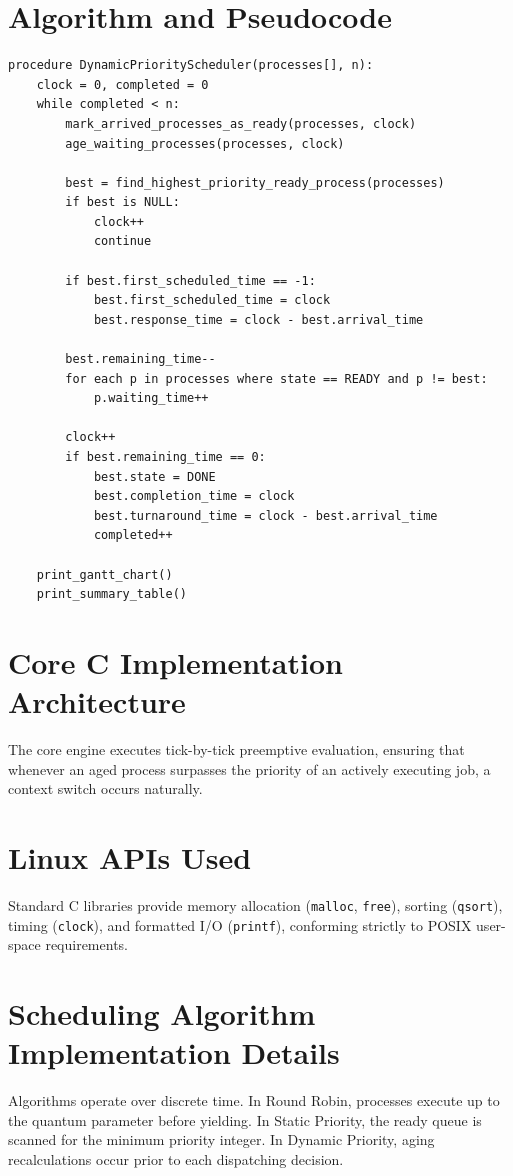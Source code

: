 \documentclass[12pt,a4paper]{report}
\begin{document}
\section{Algorithm and Pseudocode}
\begin{lstlisting}[caption={Dynamic Priority Scheduling Pseudocode}]
procedure DynamicPriorityScheduler(processes[], n):
    clock = 0, completed = 0
    while completed < n:
        mark_arrived_processes_as_ready(processes, clock)
        age_waiting_processes(processes, clock)
        
        best = find_highest_priority_ready_process(processes)
        if best is NULL:
            clock++
            continue
            
        if best.first_scheduled_time == -1:
            best.first_scheduled_time = clock
            best.response_time = clock - best.arrival_time
            
        best.remaining_time--
        for each p in processes where state == READY and p != best:
            p.waiting_time++
            
        clock++
        if best.remaining_time == 0:
            best.state = DONE
            best.completion_time = clock
            best.turnaround_time = clock - best.arrival_time
            completed++
            
    print_gantt_chart()
    print_summary_table()
\end{lstlisting}

\section{Core C Implementation Architecture}
The core engine executes tick-by-tick preemptive evaluation, ensuring that whenever an aged process surpasses the priority of an actively executing job, a context switch occurs naturally.

\section{Linux APIs Used}
Standard C libraries provide memory allocation (\texttt{malloc}, \texttt{free}), sorting (\texttt{qsort}), timing (\texttt{clock}), and formatted I/O (\texttt{printf}), conforming strictly to POSIX user-space requirements.

\section{Scheduling Algorithm Implementation Details}
Algorithms operate over discrete time. In Round Robin, processes execute up to the quantum parameter before yielding. In Static Priority, the ready queue is scanned for the minimum priority integer. In Dynamic Priority, aging recalculations occur prior to each dispatching decision.
\end{document}
